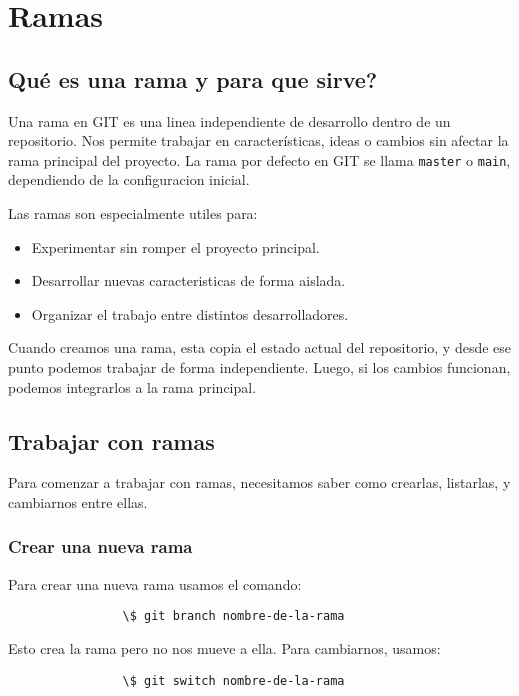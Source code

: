 \section{Ramas}

    \subsection{Qu\'e es una rama y para que sirve?}
        Una rama en GIT es una linea independiente de desarrollo dentro de un repositorio. Nos permite trabajar en caracter\'isticas, ideas o cambios sin afectar la rama principal del proyecto. La rama por defecto en GIT se llama \texttt{master} o \texttt{main}, dependiendo de la configuracion inicial.

        Las ramas son especialmente utiles para:
        \begin{itemize}
            \item Experimentar sin romper el proyecto principal.
            \item Desarrollar nuevas caracteristicas de forma aislada.
            \item Organizar el trabajo entre distintos desarrolladores.
        \end{itemize}

        Cuando creamos una rama, esta copia el estado actual del repositorio, y desde ese punto podemos trabajar de forma independiente. Luego, si los cambios funcionan, podemos integrarlos a la rama principal.

    \subsection{Trabajar con ramas}
        Para comenzar a trabajar con ramas, necesitamos saber como crearlas, listarlas, y cambiarnos entre ellas.

        \subsubsection{Crear una nueva rama}
            Para crear una nueva rama usamos el comando:
            \begin{lstlisting}
                \$ git branch nombre-de-la-rama
            \end{lstlisting}

            Esto crea la rama pero no nos mueve a ella. Para cambiarnos, usamos:

            \begin{lstlisting}
                \$ git switch nombre-de-la-rama
            \end{lstlisting}

